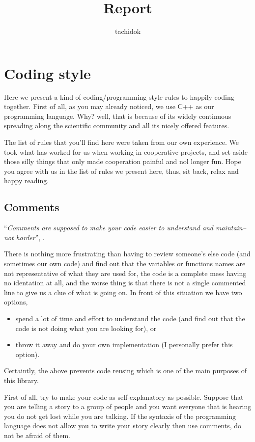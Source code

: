 \documentclass[12pt,a4paper,final]{report} %
\author{tachidok}
\title{Report}
\begin{document}


\chapter{Coding style}
Here we present a kind of coding/programming style rules to happily
coding together. First of all, as you may already noticed, we use C++
as our programming language. Why? well, that is because of its widely
continuous spreading along the scientific community and all its nicely
offered features.

The list of rules that you'll find here were taken from our own
experience. We took what has worked for us when working in cooperative
projects, and set aside those silly things that only made cooperation
painful and nol longer fun. Hope you agree with us in the list of
rules we present here, thus, sit back, relax and happy reading.

\section{Comments}

``\textit{Comments are supposed to make your code easier to understand
  and maintain-- not harder}'', \cite{when_comments_go_bad:URL}.

There is nothing more frustrating than having to review someone's else
code (and sometimes our own code) and find out that the variables or
functions names are not representative of what they are used for, the
code is a complete mess having no identation at all, and the worse
thing is that there is not a single commented line to give us a clue
of what is going on. In front of this situation we have two options,
\begin{itemize}
\item spend a lot of time and effort to understand the code (and find
  out that the code is not doing what you are looking for), or
\item throw it away and do your own implementation (I personally
  prefer this option).
\end{itemize}

Certaintly, the above prevents code reusing which is one of the main
purposes of this library.

First of all, try to make your code as self-explanatory as
possible. Suppose that you are telling a story to a group of people
and you want everyone that is hearing you do not get lost while you
are talking. If the syntaxis of the programming language does not
allow you to write your story clearly then use comments, do not be
afraid of them.
\end{document}

